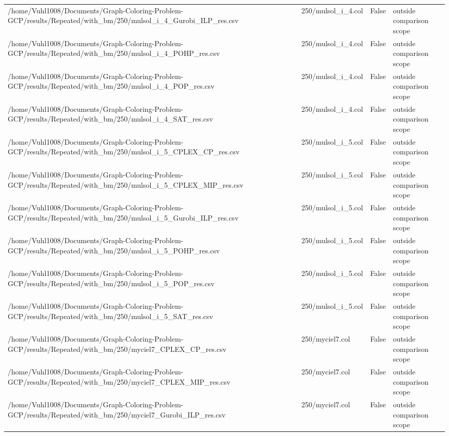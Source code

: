 \begin{table}[htbp]
\begin{tabular}{llll}
/home/Vuhl1008/Documents/Graph-Coloring-Problem-GCP/results/Repeated/with\_bm/250/mulsol\_i\_4\_Gurobi\_ILP\_res.csv & 250/mulsol\_i\_4.col & False & outside comparison scope \\
/home/Vuhl1008/Documents/Graph-Coloring-Problem-GCP/results/Repeated/with\_bm/250/mulsol\_i\_4\_POHP\_res.csv & 250/mulsol\_i\_4.col & False & outside comparison scope \\
/home/Vuhl1008/Documents/Graph-Coloring-Problem-GCP/results/Repeated/with\_bm/250/mulsol\_i\_4\_POP\_res.csv & 250/mulsol\_i\_4.col & False & outside comparison scope \\
/home/Vuhl1008/Documents/Graph-Coloring-Problem-GCP/results/Repeated/with\_bm/250/mulsol\_i\_4\_SAT\_res.csv & 250/mulsol\_i\_4.col & False & outside comparison scope \\
/home/Vuhl1008/Documents/Graph-Coloring-Problem-GCP/results/Repeated/with\_bm/250/mulsol\_i\_5\_CPLEX\_CP\_res.csv & 250/mulsol\_i\_5.col & False & outside comparison scope \\
/home/Vuhl1008/Documents/Graph-Coloring-Problem-GCP/results/Repeated/with\_bm/250/mulsol\_i\_5\_CPLEX\_MIP\_res.csv & 250/mulsol\_i\_5.col & False & outside comparison scope \\
/home/Vuhl1008/Documents/Graph-Coloring-Problem-GCP/results/Repeated/with\_bm/250/mulsol\_i\_5\_Gurobi\_ILP\_res.csv & 250/mulsol\_i\_5.col & False & outside comparison scope \\
/home/Vuhl1008/Documents/Graph-Coloring-Problem-GCP/results/Repeated/with\_bm/250/mulsol\_i\_5\_POHP\_res.csv & 250/mulsol\_i\_5.col & False & outside comparison scope \\
/home/Vuhl1008/Documents/Graph-Coloring-Problem-GCP/results/Repeated/with\_bm/250/mulsol\_i\_5\_POP\_res.csv & 250/mulsol\_i\_5.col & False & outside comparison scope \\
/home/Vuhl1008/Documents/Graph-Coloring-Problem-GCP/results/Repeated/with\_bm/250/mulsol\_i\_5\_SAT\_res.csv & 250/mulsol\_i\_5.col & False & outside comparison scope \\
/home/Vuhl1008/Documents/Graph-Coloring-Problem-GCP/results/Repeated/with\_bm/250/myciel7\_CPLEX\_CP\_res.csv & 250/myciel7.col & False & outside comparison scope \\
/home/Vuhl1008/Documents/Graph-Coloring-Problem-GCP/results/Repeated/with\_bm/250/myciel7\_CPLEX\_MIP\_res.csv & 250/myciel7.col & False & outside comparison scope \\
/home/Vuhl1008/Documents/Graph-Coloring-Problem-GCP/results/Repeated/with\_bm/250/myciel7\_Gurobi\_ILP\_res.csv & 250/myciel7.col & False & outside comparison scope \\

\end{tabular}
\end{table}
